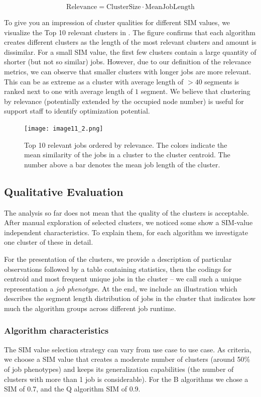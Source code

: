 \documentclass{jhps}
\begin{document}
\begin{equation}
\text{Relevance} = \text{ClusterSize} \cdot \text{MeanJobLength}
\label{eq:rel}
\end{equation}

To give you an impression of cluster qualities for different SIM values, we visualize the Top 10 relevant clusters in .
The figure confirms that each algorithm creates different clusters as the length of the most relevant clusters and amount is dissimilar.
For a small SIM value, the first few clusters contain a large quantity of shorter (but not so similar) jobs.
However, due to our definition of the relevance metrics, we can observe that smaller clusters with longer jobs are more relevant.
This can be as extreme as a cluster with average length of $>40$ segments is ranked next to one with average length of $1$ segment.
We believe that clustering by relevance (potentially extended by the occupied node number) is useful for support staff to identify optimization potential.

\begin{figure}
  \centering
   \texttt{[image: image11\_2.png]}
   \caption{Top 10 relevant jobs ordered by relevance.
   The colors indicate the mean similarity of the jobs in a cluster to the cluster centroid.
   The number above a bar denotes the mean job length of the cluster.}
   \label{fig:top10_relevant_jobs}
\end{figure}

\subsection{Qualitative Evaluation}
The analysis so far does not mean that the quality of the clusters is acceptable.
After manual exploration of selected clusters, we noticed some show a SIM-value independent characteristics.
To explain them, for each algorithm we investigate one cluster of these in detail.

For the presentation of the clusters, we provide a description of particular observations followed by a table containing statistics, then the codings for centroid and most frequent unique jobs in the cluster -- we call such a unique representation a \textit{job phenotype}.
At the end, we include an illustration which describes the segment length distribution of jobs in the cluster that indicates how much the algorithm groups across different job runtime.

\subsubsection{Algorithm characteristics}
The SIM value selection strategy can vary from use case to use case.
As criteria, we choose a SIM value that creates a moderate number of clusters (around 50\% of job phenotypes) and keeps its generalization capabilities (the number of clusters with more than 1 job is considerable).
For the B algorithms we chose a SIM of 0.7, and the Q algorithm SIM of 0.9.
\end{document}
